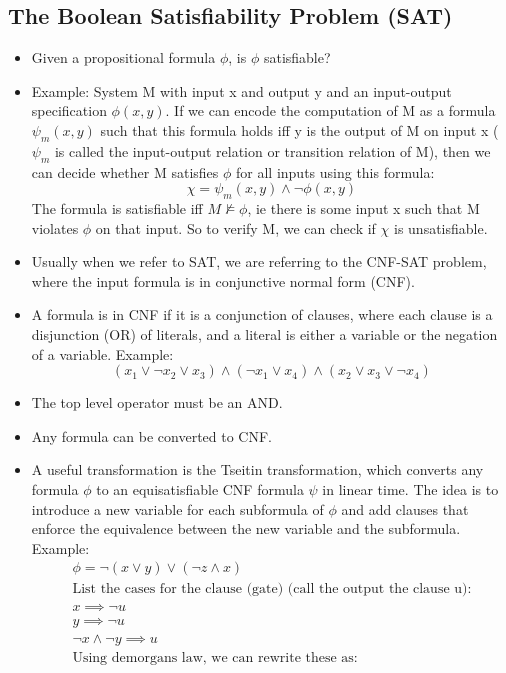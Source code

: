 \documentclass{article}
\begin{document}
\subsection{The Boolean Satisfiability Problem (SAT)}
\begin{itemize}
\item Given a propositional formula $\phi$, is $\phi$ satisfiable?
\item Example: System M with input x and output y and an input-output specification $\phi(x, y)$. If we can encode the computation of M as a formula $\psi_m(x,y)$ such that this formula holds iff y is the output of M on input x ($\psi_m$ is called the input-output relation or transition relation of M), then we can decide whether M satisfies $\phi$ for all inputs using this formula: \[\chi = \psi_m(x, y) \land \neg \phi(x, y)\] The formula is satisfiable iff $M\not\models \phi$, ie there is some input x such that M violates $\phi$ on that input. So to verify M, we can check if $\chi$ is unsatisfiable.
\item Usually when we refer to SAT, we are referring to the CNF-SAT problem, where the input formula is in conjunctive normal form (CNF).
\item A formula is in CNF if it is a conjunction of clauses, where each clause is a disjunction (OR) of literals, and a literal is either a variable or the negation of a variable. Example: \[(x_1 \lor \neg x_2 \lor x_3) \land (\neg x_1 \lor x_4) \land (x_2 \lor x_3 \lor \neg x_4)
\]
\item The top level operator must be an AND.
\item Any formula can be converted to CNF.
\item A useful transformation is the Tseitin transformation, which converts any formula $\phi$ to an equisatisfiable CNF formula $\psi$ in linear time. The idea is to introduce a new variable for each subformula of $\phi$ and add clauses that enforce the equivalence between the new variable and the subformula. Example: \begin{align*}
\phi = \neg(x\lor y)\lor(\neg z\land x) \\
\text{List the cases for the clause (gate) (call the output the clause u):} \\
x\implies \neg u \\
y\implies \neg u \\
\neg x \land \neg y \implies u \\
\text{Using demorgans law, we can rewrite these as:} \\

\end{align*}
\end{itemize}
\end{document}
